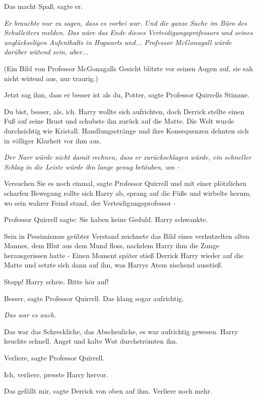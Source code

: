 \glqq{}Das macht Spaß\grqq{}, sagte er.

\emph{Er brauchte nur zu sagen, dass es vorbei war. Und die ganze Sache im Büro
des Schulleiters melden. Das wäre das Ende dieses Verteidigungsprofessors und
seines unglückseligen Aufenthalts in Hogwarts und... Professor McGonagall würde
darüber wütend sein, aber...}

(Ein Bild von Professor McGonagalls Gesicht blitzte vor seinen Augen auf, sie
sah nicht wütend aus, nur traurig.)

\glqq{}Jetzt sag ihm, dass er besser ist als du, Potter\grqq{}, sagte Professor
Quirrells Stimme.

\glqq{}Du bist, besser, als, ich.\grqq{} Harry wollte sich aufrichten, doch
Derrick stellte einen Fuß auf seine Brust und schubste ihn zurück auf die Matte.
Die Welt wurde durchsichtig wie Kristall. Handlungsstränge und ihre Konsequenzen
dehnten sich in völliger Klarheit vor ihm aus.

\emph{Der Narr würde nicht damit rechnen, dass er zurückschlagen würde, ein
schneller Schlag in die Leiste würde ihn lange genug betäuben, um -}

\glqq{}Versuchen Sie es noch einmal\grqq{}, sagte Professor Quirrell und mit
einer plötzlichen scharfen Bewegung rollte sich Harry ab, sprang auf die Füße
und wirbelte herum, wo sein wahrer Feind stand, der Verteidigungsprofessor -

Professor Quirrell sagte: \glqq{}Sie haben keine Geduld.\grqq{} Harry schwankte.

Sein in Pessimismus geübter Verstand zeichnete das Bild eines verhutzelten alten
Mannes, dem Blut aus dem Mund floss, nachdem Harry ihm die Zunge herausgerissen
hatte - Einen Moment später stieß Derrick Harry wieder auf die Matte und setzte
sich dann auf ihn, was Harrys Atem zischend ausstieß.

\glqq{}Stopp!\grqq{} Harry schrie. \glqq{}Bitte hör auf!\grqq{}

\glqq{}Besser\grqq{}, sagte Professor Quirrell. \glqq{}Das klang sogar
aufrichtig.\grqq{}

\emph{Das war es auch.}

Das war das Schreckliche, das Abscheuliche, es war aufrichtig gewesen. Harry
keuchte schnell, Angst und kalte Wut durchströmten ihn.

\glqq{}Verliere\grqq{}, sagte Professor Quirrell.

\glqq{}Ich, verliere\grqq{}, presste Harry hervor.

\glqq{}Das gefällt mir\grqq{}, sagte Derrick von oben auf ihm. \glqq{}Verliere
noch mehr.\grqq{}

